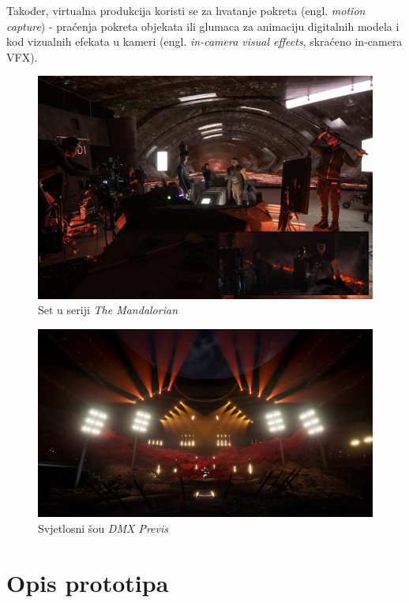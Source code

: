 \documentclass[times, utf8, zavrsni, numeric]{fer}
\begin{document}
Također, virtualna produkcija koristi se za hvatanje pokreta (engl. \emph{motion capture}) - praćenja pokreta objekata ili glumaca za animaciju digitalnih modela i kod vizualnih efekata u kameri (engl. \emph{in-camera visual effects}, skraćeno in-camera VFX).

\begin{figure}[htp]
	\centering
	\includegraphics[width=\linewidth]{slika 2-3.png}
	\caption{Set u seriji \emph{The Mandalorian} \cite{mandalorian}}
	\label{fig:slika 2-3}
\end{figure}

\begin{figure}[htp]
	\centering
	\includegraphics[width=\linewidth]{slika 2-4.png}
	\caption{Svjetlosni šou \emph{DMX Previs} \cite{dmx_previs}}
	\label{fig:slika 2-4}
\end{figure}

\pagebreak

\section{Opis prototipa}
\end{document}
